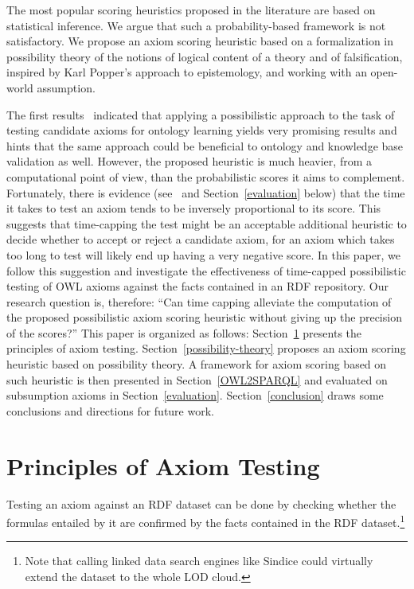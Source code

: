\documentclass{sig-alternate}
\begin{document}
The most popular scoring heuristics proposed in the literature are based on statistical inference.
We argue that such a probability-based framework is not satisfactory.
We propose an axiom scoring heuristic based on a formalization in possibility theory of
the notions of logical content of a theory and of falsification, inspired
by Karl Popper's approach to epistemology, and working with an open-world assumption.

The first results~\cite{TettamanziFaronZuckerGandon2014ekaw} indicated that
applying a possibilistic approach to the task of testing candidate axioms
for ontology learning yields very promising results and hints that the same approach
could be beneficial to ontology and knowledge base validation as well.
However, the proposed heuristic is much heavier, from a computational
point of view, than the probabilistic scores it aims to complement.
Fortunately, there is evidence (see~\cite{TettamanziFaronZuckerGandon2014ekaw} and
Section~\ref{evaluation} below) that the time it takes to test an axiom
tends to be inversely proportional to its score.
This suggests that time-capping the test might be an acceptable additional heuristic
to decide whether to accept or reject a candidate axiom, for an axiom which takes
too long to test will likely end up having a very negative score.
In this paper, we follow this suggestion and investigate the effectiveness
of time-capped possibilistic testing of OWL axioms against the facts contained
in an RDF repository.
Our research question is, therefore: ``Can time capping alleviate the computation
of the proposed possibilistic axiom scoring heuristic without giving up
the precision of the scores?''
This paper is organized as follows: 
Section~\ref{principles} presents the principles of axiom testing.
Section~\ref{possibility-theory}
proposes an axiom scoring heuristic based on possibility theory.
A framework for axiom scoring based on such heuristic is then presented in
Section~\ref{OWL2SPARQL} and evaluated on subsumption axioms in Section~\ref{evaluation}.
Section~\ref{conclusion} draws some conclusions and directions for future work.

\section{Principles of Axiom Testing}\label{principles}

Testing an axiom against an RDF dataset can be done by checking whether the formulas entailed by it
are confirmed by the facts contained in the RDF dataset.\footnote{Note that calling linked data search engines
like Sindice could virtually extend the dataset to the whole LOD cloud.}
\end{document}

